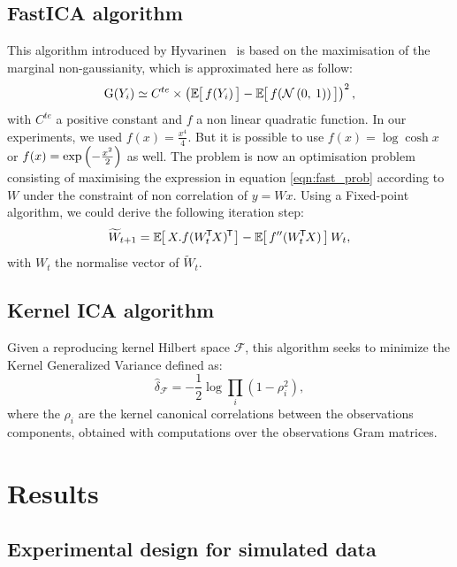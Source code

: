 \documentclass[a4paper]{article}
\newcommand{\zZ}[2]{\mathrm #1\!\zp{#2}}
\newcommand{\Ng}[2]{\mathcal{N}\zp{#1,\:#2}}
\begin{document}
\subsection{FastICA algorithm}
This algorithm introduced by Hyvarinen~\cite{hyvarinen99} is based on the maximisation of the marginal non-gaussianity, which is approximated here as follow:
\begin{equation}\label{eqn:fast_prob}
  \zZ G{Y_i} \simeq C^{te}\times\zp{\zesp{f(Y_i)} - \zesp{f(\Ng 01)}}^2,
\end{equation}
with $C^{te}$ a positive constant and $f$ a non linear quadratic function.
In our experiments, we used $f(x) = \frac{x^4}4$. But it is possible to use $f(x) = \log \cosh x$ or $f(x) = \exp\zp{-\frac{x^2}2}$ as well.
The problem is now an optimisation problem consisting of maximising the expression in equation \ref{eqn:fast_prob} according to $W$ under the constraint of non correlation of $y = Wx$. Using a Fixed-point algorithm, we could derive the following iteration step:
\begin{equation}
  \widetilde W_{t+1} = \zesp{X.\ztr{f(\ztr{W_t}X)}} - \zesp{f''(\ztr{W_t}X)}W_t,
\end{equation}
with $W_t$ the normalise vector of $\widetilde W_t$.

\subsection{Kernel ICA algorithm}
Given a reproducing kernel Hilbert space $\mathcal{F}$, this algorithm seeks to minimize the Kernel Generalized Variance defined as:
\begin{equation}
	\widehat{\delta}_{\mathcal{F}}=-\frac{1}{2}\log \underset{i}{\prod}(1-\rho_i^2),
\end{equation}
where the $\rho_i$ are the kernel canonical correlations between the observations components, obtained with computations over the observations Gram matrices.


\section{Results}

\subsection{Experimental design for simulated data}
\end{document}
